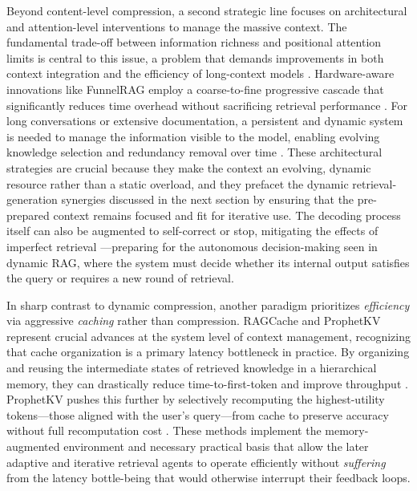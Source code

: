 \documentclass[11pt,a4paper]{article}
\begin{document}
Beyond content-level compression, a second strategic line focuses on architectural and attention-level interventions to manage the massive context. The fundamental trade-off between information richness and positional attention limits is central to this issue, a problem that demands improvements in both context integration and the efficiency of long-context models \cite{arxiv:2506.00054v1}. Hardware-aware innovations like FunnelRAG employ a coarse-to-fine progressive cascade that significantly reduces time overhead without sacrificing retrieval performance \cite{arxiv:2410.10293v3}. For long conversations or extensive documentation, a persistent and dynamic system is needed to manage the information visible to the model, enabling evolving knowledge selection and redundancy removal over time \cite{arxiv:2603.01783v1}. These architectural strategies are crucial because they make the context an evolving, dynamic resource rather than a static overload, and they prefacet the dynamic retrieval-generation synergies discussed in the next section by ensuring that the pre-prepared context remains focused and fit for iterative use. The decoding process itself can also be augmented to self-correct or stop, mitigating the effects of imperfect retrieval \cite{arxiv:2505.02811v2}---preparing for the autonomous decision-making seen in dynamic RAG, where the system must decide whether its internal output satisfies the query or requires a new round of retrieval.

In sharp contrast to dynamic compression, another paradigm prioritizes \emph{efficiency} via aggressive \emph{caching} rather than compression. RAGCache and ProphetKV represent crucial advances at the system level of context management, recognizing that cache organization is a primary latency bottleneck in practice. By organizing and reusing the intermediate states of retrieved knowledge in a hierarchical memory, they can drastically reduce time-to-first-token and improve throughput \cite{arxiv:2404.12457v2}. ProphetKV pushes this further by selectively recomputing the highest-utility tokens---those aligned with the user's query---from cache to preserve accuracy without full recomputation cost \cite{arxiv:2602.02579v3}. These methods implement the memory-augmented environment and necessary practical basis that allow the later adaptive and iterative retrieval agents to operate efficiently without \emph{suffering} from the latency bottle-being that would otherwise interrupt their feedback loops.
\end{document}
